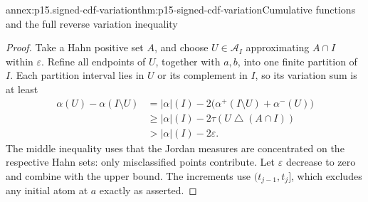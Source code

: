 \begin{annexitem}{annex:p15.signed-cdf-variation}{thm:p15-signed-cdf-variation}{Cumulative functions and the full reverse variation inequality}
\begin{proof}
Take a Hahn positive set \(A\), and choose \(U\in\mathcal A_I\)
approximating \(A\cap I\) within \(\varepsilon\).
Refine all endpoints of \(U\), together with \(a,b\), into one finite
partition of \(I\). Each partition interval lies in \(U\) or its
complement in \(I\), so its variation sum is at least
\[
 \begin{aligned}
 \alpha(U)-\alpha(I\setminus U)
   &=\lvert\alpha\rvert(I)
           -2\bigl(\alpha^+(I\setminus U)+\alpha^-(U)\bigr)\\
   &\geq\lvert\alpha\rvert(I)-2\tau(U\mathbin{\triangle}(A\cap I))\\
   &>\lvert\alpha\rvert(I)-2\varepsilon .
 \end{aligned}
\]
The middle inequality uses that the Jordan measures are concentrated
on the respective Hahn sets: only misclassified points contribute.
Let \(\varepsilon\) decrease to zero and combine with the upper bound.
The increments use \((t_{j-1},t_j]\), which excludes any initial atom
at \(a\) exactly as asserted.
\end{proof}
\end{annexitem}

